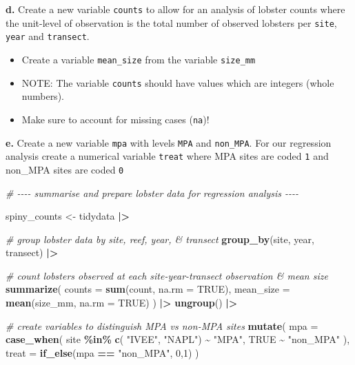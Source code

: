 \documentclass[
]{article}
\newenvironment{Shaded}{\begin{snugshade}}{\end{snugshade}}
\newcommand{\AttributeTok}[1]{\textcolor[rgb]{0.13,0.29,0.53}{#1}}
\newcommand{\CommentTok}[1]{\textcolor[rgb]{0.56,0.35,0.01}{\textit{#1}}}
\newcommand{\ConstantTok}[1]{\textcolor[rgb]{0.56,0.35,0.01}{#1}}
\newcommand{\DecValTok}[1]{\textcolor[rgb]{0.00,0.00,0.81}{#1}}
\newcommand{\FunctionTok}[1]{\textcolor[rgb]{0.13,0.29,0.53}{\textbf{#1}}}
\newcommand{\NormalTok}[1]{#1}
\newcommand{\OtherTok}[1]{\textcolor[rgb]{0.56,0.35,0.01}{#1}}
\newcommand{\SpecialCharTok}[1]{\textcolor[rgb]{0.81,0.36,0.00}{\textbf{#1}}}
\newcommand{\StringTok}[1]{\textcolor[rgb]{0.31,0.60,0.02}{#1}}
\providecommand{\tightlist}{%
  \setlength{\itemsep}{0pt}\setlength{\parskip}{0pt}}
\begin{document}
\textbf{d.} Create a new variable \texttt{counts} to allow for an
analysis of lobster counts where the unit-level of observation is the
total number of observed lobsters per \texttt{site}, \texttt{year} and
\texttt{transect}.

\begin{itemize}
\tightlist
\item
  Create a variable \texttt{mean\_size} from the variable
  \texttt{size\_mm}
\item
  NOTE: The variable \texttt{counts} should have values which are
  integers (whole numbers).
\item
  Make sure to account for missing cases (\texttt{na})!
\end{itemize}

\textbf{e.} Create a new variable \texttt{mpa} with levels \texttt{MPA}
and \texttt{non\_MPA}. For our regression analysis create a numerical
variable \texttt{treat} where MPA sites are coded \texttt{1} and
non\_MPA sites are coded \texttt{0}

\begin{Shaded}
\begin{Highlighting}[]
\CommentTok{\# {-}{-}{-}{-} summarise and prepare lobster data for regression analysis {-}{-}{-}{-}}

\NormalTok{spiny\_counts }\OtherTok{\textless{}{-}}\NormalTok{ tidydata }\SpecialCharTok{|\textgreater{}}
    
    \CommentTok{\# group lobster data by site, reef, year, \& transect}
    \FunctionTok{group\_by}\NormalTok{(site, year, transect) }\SpecialCharTok{|\textgreater{}}
    
    \CommentTok{\# count lobsters observed at each site{-}year{-}transect observation \& mean size}
    \FunctionTok{summarize}\NormalTok{(}
        \AttributeTok{counts =} \FunctionTok{sum}\NormalTok{(count, }\AttributeTok{na.rm =} \ConstantTok{TRUE}\NormalTok{),}
        \AttributeTok{mean\_size =} \FunctionTok{mean}\NormalTok{(size\_mm, }\AttributeTok{na.rm =} \ConstantTok{TRUE}\NormalTok{)}
\NormalTok{    ) }\SpecialCharTok{|\textgreater{}}
    \FunctionTok{ungroup}\NormalTok{() }\SpecialCharTok{|\textgreater{}}
    
    \CommentTok{\# create variables to distinguish MPA vs non{-}MPA sites}
    \FunctionTok{mutate}\NormalTok{(}
        \AttributeTok{mpa =} \FunctionTok{case\_when}\NormalTok{(}
\NormalTok{            site }\SpecialCharTok{\%in\%} \FunctionTok{c}\NormalTok{( }\StringTok{"IVEE"}\NormalTok{,  }\StringTok{"NAPL"}\NormalTok{) }\SpecialCharTok{\textasciitilde{}} \StringTok{"MPA"}\NormalTok{,}
            \ConstantTok{TRUE} \SpecialCharTok{\textasciitilde{}} \StringTok{"non\_MPA"}
\NormalTok{            ),}
        \AttributeTok{treat =} \FunctionTok{if\_else}\NormalTok{(mpa }\SpecialCharTok{==} \StringTok{"non\_MPA"}\NormalTok{, }\DecValTok{0}\NormalTok{,}\DecValTok{1}\NormalTok{)}
\NormalTok{    )}
\end{Highlighting}
\end{Shaded}
\end{document}
